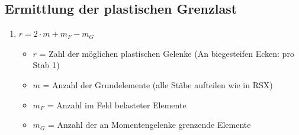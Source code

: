 \documentclass[fleqn,twoside]{article}
\begin{document}
    \subsection{Ermittlung der plastischen Grenzlast}
        \begin{enumerate}
            \item $r=2\cdot m +m_F - m_G$
                \begin{itemize}
                    \item $r$ = Zahl der möglichen plastischen Gelenke (An biegesteifen Ecken: pro Stab 1)
                    \item $m$ = Anzahl der Grundelemente (alle Stäbe aufteilen wie in RSX)
                    \item $m_F$ = Anzahl im Feld belasteter Elemente
                    \item $m_G$ = Anzahl der an Momentengelenke grenzende Elemente
                \end{itemize}


\end{enumerate}
\end{document}

